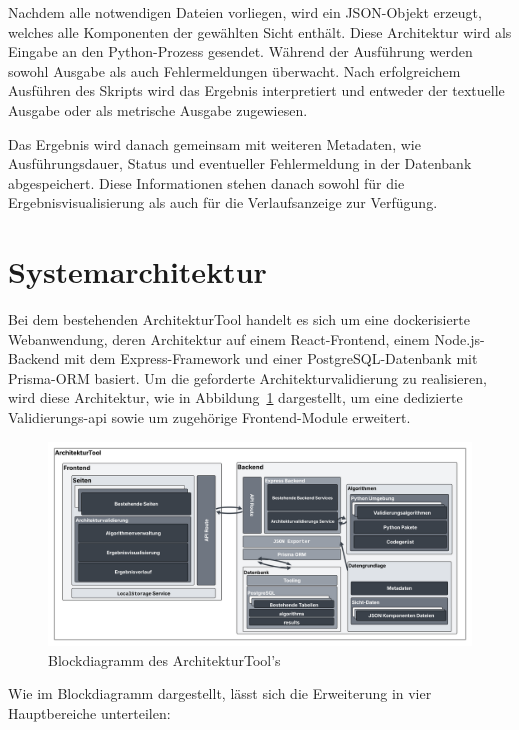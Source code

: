 Nachdem alle notwendigen Dateien vorliegen, wird ein JSON-Objekt erzeugt, welches alle Komponenten der gewählten Sicht enthält. Diese Architektur wird als Eingabe an den Python-Prozess gesendet. Während der Ausführung werden sowohl Ausgabe als auch Fehlermeldungen überwacht. Nach erfolgreichem Ausführen des Skripts wird das Ergebnis interpretiert und entweder der textuelle Ausgabe oder als metrische Ausgabe zugewiesen.

Das Ergebnis wird danach gemeinsam mit weiteren Metadaten, wie Ausführungsdauer, Status und eventueller Fehlermeldung in der Datenbank abgespeichert. Diese Informationen stehen danach sowohl für die Ergebnisvisualisierung als auch für die Verlaufsanzeige zur Verfügung.

\section{Systemarchitektur}
\label{sec:sysarchitektur}

Bei dem bestehenden ArchitekturTool handelt es sich um eine dockerisierte Webanwendung, deren Architektur auf einem React-Frontend, einem Node.js-Backend mit dem Express-Framework und einer PostgreSQL-Datenbank mit Prisma-ORM basiert. Um die geforderte Architekturvalidierung zu realisieren, wird diese Architektur, wie in Abbildung~\ref{fig:blockdiagram} dargestellt, um eine dedizierte Validierungs-\gls{api} sowie um zugehörige Frontend-Module erweitert.


\begin{figure}[h!]
  \centering
  \includegraphics[width=\textwidth]{figures/04Konzeption/Blockdiagram.png}
  \caption{Blockdiagramm des ArchitekturTool's}
  \label{fig:blockdiagram}
\end{figure}


Wie im Blockdiagramm dargestellt, lässt sich die Erweiterung in vier Hauptbereiche unterteilen:


